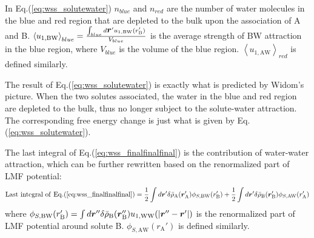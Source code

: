 \documentclass[9pt]{article}
\renewcommand{\vec}[1]{\mbox{\boldmath$#1$}}
\newcommand{\A}{\mathrm{A}}
\newcommand{\W}{\mathrm{W}}
\newcommand{\B}{\mathrm{B}}
\begin{document}
In Eq.(\ref{eq:wss_solutewater}) $n_{blue}$ and $n_{red}$ are the number of water molecules in the blue and red region that are depleted to the bulk upon the association of A and B. $\left\langle u_{1,\B\W} \right\rangle_{blue} = \frac{\int_{blue}d \vec{r}' u_{1,\B\W}(r_{\B}')}{V_{blue}} $ is the average strength of BW attraction in the blue region, where $V_{blue}$ is the volume of the blue region. $\left\langle u_{1,\A\W} \right\rangle_{red}$ is defined similarly.

The result of Eq.(\ref{eq:wss_solutewater}) is exactly what is predicted by Widom's picture. When the two solutes associated, the water in the blue and red region are depleted to the bulk, thus no longer subject to the solute-water attraction. The corresponding free energy change is just what is given by Eq.(\ref{eq:wss_solutewater}). 

The last integral of Eq.(\ref{eq:wss_finalfinalfinal}) is the contribution of water-water attraction, which can be further rewritten based on the renormalized part of LMF potential:
\begin{equation}
\mathrm{Last\,\, integral\,\, of\,\, Eq.(\ref{eq:wss_finalfinalfinal})} = \frac{1}{2}\int d \vec{r}'\delta \bar{\rho}_{\A}(\vec{r}_{\A}') \phi_{S, \B\W}(r_{\B}') +  \frac{1}{2} \int d \vec{r}'\delta \bar{\rho}_{\B}(\vec{r}_{\B}') \phi_{S,\A\W}(r_{\A}')
\label{eq:wss_ww}
\end{equation}
where $\phi_{S, \B\W}(r_{\B}') = \int d\vec{r}'' \delta \bar{\rho}_{ \B}(\vec{r}_{\B}'')u_{1,\W\W}(|\vec{r}'' - \vec{r}'|) $ is the renormalized part of LMF potential around solute B. $\phi_{S,\A\W}(r_{\A}')$ is defined similarly.
\end{document}
